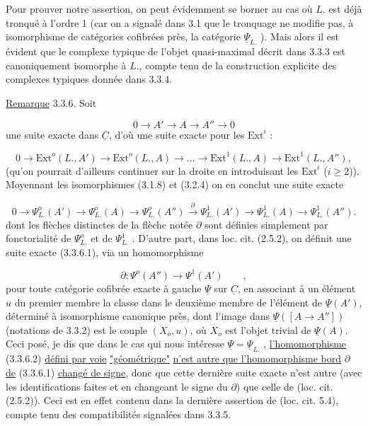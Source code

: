 Pour prouver notre assertion, on peut évidemment se borner au cas où $L.$ est déjà tronqué à l'ordre 1 (car on a signalé dans 3.1 que le tronquage ne modifie pas, à isomorphisme de catégories cofibrées près, la catégorie $\underline{\Psi}_{L.}$ ). Mais alors il est évident que le complexe typique de l'objet quasi-maximal décrit dans 3.3.3 est canoniquement isomorphe à $L.$, compte tenu de la construction explicite des complexes typiques donnée dans 3.3.4.

\underline{Remarque} 3.3.6. Soit

\begin{equation*}
0 \longrightarrow A' \longrightarrow A \longrightarrow A'' \longrightarrow 0
\end{equation*}
une suite exacte dans $\underline{C}$, d'où une suite exacte pour les $\mathrm{Ext}^i$ :

\begin{equation*}
0 \longrightarrow \mathrm{Ext}^o(L.,A') \longrightarrow \mathrm{Ext}^o(L.,A) \rightarrow \ldots \rightarrow \mathrm{Ext}^1(L.,A) \longrightarrow \mathrm{Ext}^1(L.,A''),
\end{equation*}
(qu'on pourrait d'ailleurs continuer sur la droite en introduisant les $\mathrm{Ext}^i$ ($i \geq 2$)). Moyennant les isomorphismes (3.1.8) et (3.2.4) on en conclut une suite exacte

\begin{equation}\tag{3.3.6.1}
0 \longrightarrow \Psi^o_{L.}(A') \longrightarrow \Psi^o_{L.}(A) \longrightarrow \Psi^o_{L.}(A'') \xrightarrow{\ \partial\ } \Psi^1_{L.}(A') \rightarrow \Psi^1_{L.}(A) \rightarrow \Psi^1_{L.}(A'').
\end{equation}
dont les flèches distinctes de la flèche notée $\partial$ sont définies simplement par fonctorialité de $\Psi^o_{L.}$ et de $\Psi^1_{L.}$ . D'autre part, dans loc. cit. (2.5.2), on définit une suite exacte (3.3.6.1), via un homomorphisme 



\begin{equation}\tag{3.3.6.2}
 \partial : \Psi^{o}(A'') \longrightarrow \Psi^{1}(A') \qquad ,
\end{equation}
pour toute catégorie cofibrée exacte à gauche $\underline{\Psi}$ sur $\underline{C}$, en associant à un élément $u$ du premier membre la classe dans le deuxième membre de l'élément de $\underline{\Psi}(A')$, déterminé à isomorphisme canonique près, dont l'image dans $\underline{\Psi}([A \longrightarrow A''])$ (notations de 3.3.2) est le couple $(X_o,u)$, où $X_o$ est l'objet trivial de $\underline{\Psi}(A)$. Ceci posé, je dis que dans le cas qui nous intéresse $\underline{\Psi} = \underline{\Psi}_{L.}$ , \underline{l'homomorphisme} (3.3.6.2) \underline{défini par voie} \underline{"géométrique"} \underline{n'est autre que l'homomorphisme bord} $\partial$ \underline{de} (3.3.6.1) \underline{changé de signe}, donc que cette dernière suite exacte n'est autre (avec les identifications faites et en changeant le signe du $\partial$) que celle de (loc. cit. (2.5.2)). Ceci est en effet contenu dans la dernière assertion de (loc. cit. 5.4), compte tenu des compatibilités signalées dans 3.3.5.

